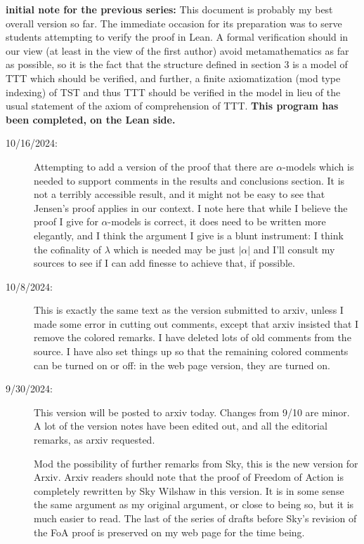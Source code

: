 \documentclass[112pt]{article}
\theoremstyle{definition}
\theoremstyle{remark}
\begin{document}
{\bf initial note for the previous series:}  This document is probably my best overall version so far.  The immediate occasion for its preparation was to serve students attempting to verify the proof in Lean.  A formal verification should in our view (at least in the view of the first author) avoid metamathematics as far as possible, so it is the fact that the structure defined in section 3 is a model of TTT which should be verified, and further, a finite axiomatization (mod type indexing) of TST and thus TTT should be verified in the model in lieu of the usual statement of the axiom of comprehension of TTT.  {\bf This program has been completed, on the Lean side.}
\begin{description}

\item[10/16/2024:]  Attempting to add a version of the proof that there are $\alpha$-models which is needed to support comments in the results and conclusions section.  It is not a terribly accessible result, and it might not be easy to see that Jensen's proof applies in our context.  I note here that while I believe the proof I give for $\alpha$-models is correct, it does need to be written more elegantly, and I think the argument I give is a blunt instrument:  I think the cofinality of $\lambda$ which is needed may be just $|\alpha|$ and I'll consult my sources to see if I can add finesse to achieve that, if possible.

\item[10/8/2024:]  This is exactly the same text as the version submitted to arxiv, unless I made some error in cutting out comments, except that arxiv insisted that I remove the colored remarks.    I have deleted lots of old comments from the source.  I have also set things up so that the remaining colored comments can be turned on or off:  in the web page version, they are turned on.

\item[9/30/2024:]  This version will be posted to arxiv today.  Changes from 9/10 are minor.  A lot of the version notes have been edited out, and all the editorial remarks, as arxiv requested.

Mod the possibility of further remarks from Sky, this is the new version for Arxiv.  Arxiv readers should note that the proof of Freedom of Action is completely rewritten by Sky Wilshaw in this version.  It is in some sense the same argument as my original argument, or close to being so, but it is much easier to read.  The last of the series of drafts before Sky's revision of the FoA proof is preserved on my web page for the time being.


\end{description}
\end{document}
